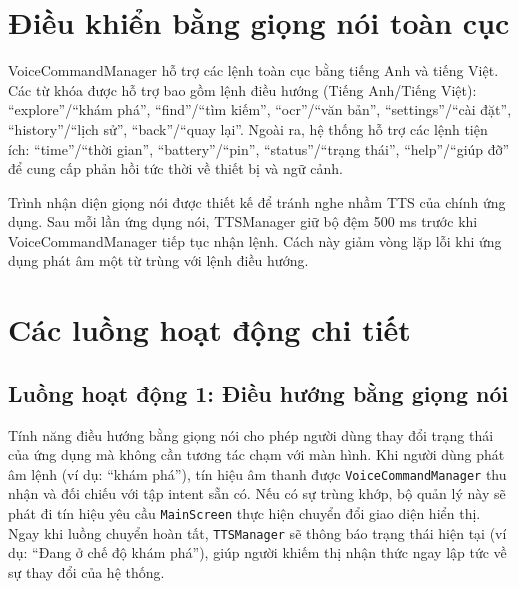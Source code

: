 \documentclass[a4paper,13pt]{report}
\begin{document}
\section{Điều khiển bằng giọng nói toàn cục}

VoiceCommandManager hỗ trợ các lệnh toàn cục bằng tiếng Anh và tiếng Việt. Các từ khóa được hỗ trợ bao gồm lệnh điều hướng (Tiếng Anh/Tiếng Việt): ``explore''/``khám phá'', ``find''/``tìm kiếm'', ``ocr''/``văn bản'', ``settings''/``cài đặt'', ``history''/``lịch sử'', ``back''/``quay lại''. Ngoài ra, hệ thống hỗ trợ các lệnh tiện ích: ``time''/``thời gian'', ``battery''/``pin'', ``status''/``trạng thái'', ``help''/``giúp đỡ'' để cung cấp phản hồi tức thời về thiết bị và ngữ cảnh.

Trình nhận diện giọng nói được thiết kế để tránh nghe nhầm TTS của chính ứng dụng. Sau mỗi lần ứng dụng nói, TTSManager giữ bộ đệm 500 ms trước khi VoiceCommandManager tiếp tục nhận lệnh. Cách này giảm vòng lặp lỗi khi ứng dụng phát âm một từ trùng với lệnh điều hướng.


\section{Các luồng hoạt động chi tiết}

\subsection{Luồng hoạt động 1: Điều hướng bằng giọng nói}

Tính năng điều hướng bằng giọng nói cho phép người dùng thay đổi trạng thái của ứng dụng mà không cần tương tác chạm với màn hình. Khi người dùng phát âm lệnh (ví dụ: ``khám phá''), tín hiệu âm thanh được \texttt{VoiceCommandManager} thu nhận và đối chiếu với tập intent sẵn có. Nếu có sự trùng khớp, bộ quản lý này sẽ phát đi tín hiệu yêu cầu \texttt{MainScreen} thực hiện chuyển đổi giao diện hiển thị. Ngay khi luồng chuyển hoàn tất, \texttt{TTSManager} sẽ thông báo trạng thái hiện tại (ví dụ: ``Đang ở chế độ khám phá''), giúp người khiếm thị nhận thức ngay lập tức về sự thay đổi của hệ thống.
\end{document}
